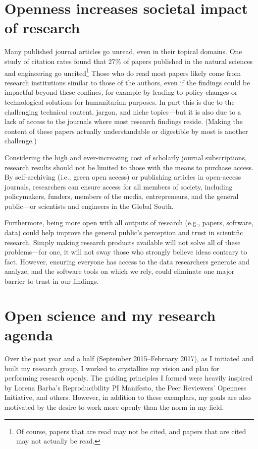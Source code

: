 \documentclass[nobib]{tufte-handout}
\begin{document}
\section{Openness increases societal impact of research}
\label{sec:impact}

Many published journal articles go unread, even in their topical domains.
One study of citation rates found that 27\% of papers published in the natural
sciences and engineering go uncited\autocite{Lariviere:2009}\footnote{Of course,
papers that are read may not be cited, and papers that are cited may not actually
be read.}
Those who do read most papers likely come from research institutions similar to
those of the authors, even if the findings could be impactful beyond these
confines, for example by leading to policy changes or technological solutions
for humanitarian purposes. In part this is due to the challenging technical content,
jargon, and niche topics---but it is also due to a lack of access to the journals
where most research findings reside. (Making the content of these papers actually
understandable or digestible by most is another challenge.)

Considering the high and ever-increasing cost of scholarly journal subscriptions,
research results should not be limited to those with the means to purchase access.
By self-archiving (i.e., green open access) or publishing articles in open-access
journals, researchers can ensure access for all members of society, including
policymakers, funders, members of the media, entrepreneurs, and the general
public---or scientists and engineers in the Global South.

Furthermore, being more open with all outputs of research (e.g., papers, software,
data) could help improve the general public's perception and trust in
scientific research. Simply making research products available will not solve
all of these problems---for one, it will not sway those who strongly believe
ideas contrary to fact. However, ensuring everyone has access to the data researchers
generate and analyze, and the software tools on which we rely, could eliminate one
major barrier to trust in our findings\autocite{Grand:2012}.

\section{Open science and my research agenda}
\label{sec:agenda}

Over the past year and a half (September 2015--February 2017), as I initiated
and built my research group, I worked to crystallize my vision and plan for
performing research openly. The guiding principles I formed were heavily
inspired by Lorena Barba's Reproducibility PI Manifesto\autocite{Barba:2012pi},
the Peer Reviewers' Openness Initiative\autocite{Morey150547}, and others.
However, in addition to these exemplars, my goals are also motivated by the desire
to work more openly than the norm in my field.
\end{document}
